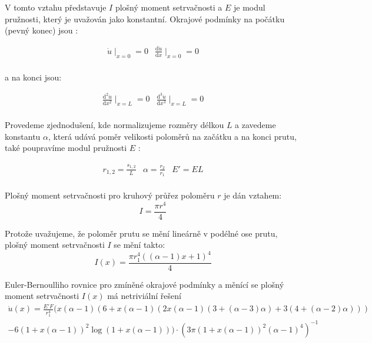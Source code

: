 V tomto vztahu představuje $I$ plošný moment setrvačnosti a $E$ je modul pružnosti, který je uvažován jako konstantní. Okrajové podmínky na počátku (pevný konec) jsou :

\begin{equation}
\begin{array}{cc}
\dot{u} \mid _{x=0} = 0 & \frac{\mathrm{d} \dot{u} }{\mathrm{d} x}\mid _{x=0} = 0 \\
\end{array}
\end{equation}

a na konci jsou:

\begin{equation}
\begin{array}{cc}
\frac{\mathrm{d}^2 \dot{u} }{\mathrm{d} x^2} \mid _{x=L} = 0 & \frac{\mathrm{d}^3 \dot{u} }{\mathrm{d} x^3}\mid _{x=L} = 0 \\
\end{array}
\end{equation}

Provedeme zjednodušení, kde normalizujeme rozměry délkou $L$ a zavedeme konstantu $\alpha$, která udává poměr velikosti poloměrů na začátku a na konci prutu, také poupravíme modul pružnosti $E$ :

\begin{equation}
\begin{array}{ccc}
r_{1,2} = \frac{s_{1,2}}{L} &\alpha = \frac{r_2}{r_1} & {E}'= EL\\
\end{array}
\end{equation}

Plošný moment setrvačnosti pro kruhový průřez poloměru $r$ je dán vztahem:
\begin{equation}
I = \frac{\pi r^4}{4}
\end{equation}

Protože uvažujeme, že poloměr prutu se mění lineárně v podélné ose prutu, plošný moment setrvačnosti $I$ se mění takto:
\begin{equation}
I(x) = \frac{\pi r_{1}^4((\alpha -1)x + 1)^4}{4}
\end{equation}

Euler-Bernoulliho rovnice pro zmíněné okrajové podmínky a měnící se plošný moment setrvačnosti $I(x)$ má netriviální řešení
\begin{multline}
\dot{u}(x)=\frac{{E}'F}{r_{1}^4}(x(\alpha-1)(6+x(\alpha-1)(2x(\alpha-1)(3+(\alpha-3)\alpha)+3(4+(\alpha-2)\alpha)))\\
 - 6 (1+x(\alpha-1))^2 \log (1+x(\alpha-1))) \cdot  (3\pi(1+x(\alpha-1))^2(\alpha-1)^4)^{-1}
\end{multline}

